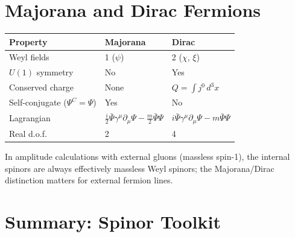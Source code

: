 \section{Majorana and Dirac Fermions}

\begin{center}
\renewcommand{\arraystretch}{1.4}
\begin{tabular}{@{}lll@{}}
  \toprule
  Property & Majorana & Dirac \\
  \midrule
  Weyl fields & 1 ($\psi$) & 2 ($\chi$, $\xi$) \\
  $U(1)$ symmetry & No & Yes \\
  Conserved charge & None & $Q = \int j^0\,d^3x$ \\
  Self-conjugate ($\Psi^C = \Psi$) & Yes & No \\
  Lagrangian & $\tfrac{i}{2}\bar\Psi\gamma^\mu\partial_\mu\Psi - \tfrac{m}{2}\bar\Psi\Psi$ &
               $i\bar\Psi\gamma^\mu\partial_\mu\Psi - m\bar\Psi\Psi$ \\
  Real d.o.f. & 2 & 4 \\
  \bottomrule
\end{tabular}
\end{center}

In amplitude calculations with external gluons (massless spin-1), the
internal spinors are always effectively massless Weyl spinors; the
Majorana/Dirac distinction matters for external fermion lines.

\section{Summary: Spinor Toolkit}

